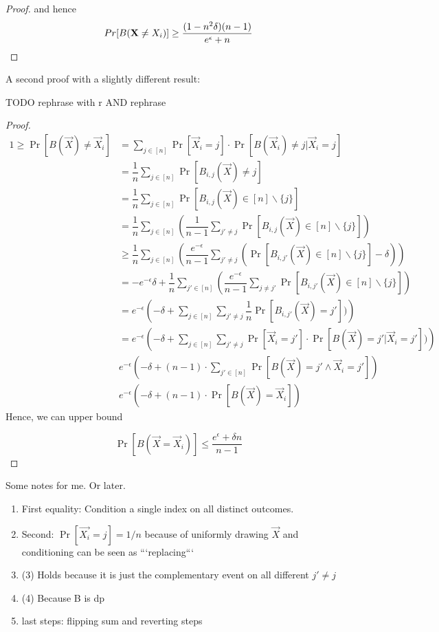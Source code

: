 \documentclass{article}
\begin{document}
{\begin{proof}
and hence 
\[
\\Pr[B(\vec{X}\neq X_i)] \geq \dfrac{(1-n^2\delta)(n-1)}{e^\epsilon + n}
\]
\end{proof}

A second proof with a slightly different result: 

TODO rephrase with r AND rephrase 
\begin{proof}
\begin{align*}
    1\geq \Pr[B(\vec{X})\neq \vec{X}_i] &= \sum\limits_{j\in [n]} \Pr[\vec{X}_i = j]\cdot \Pr[B(\vec{X}_i)\neq j|\vec{X}_i = j]\\
    &= \dfrac{1}{n} \sum\limits_{j\in [n]}\Pr[B_{i,j}(\vec{X}) \neq  j] \\
    &=\dfrac{1}{n} \sum_{j \in [n]} \Pr[B_{i,j}(\vec{X}) \in [n]\backslash\{j\} ]\\
    &=\dfrac{1}{n} \sum_{j \in [n]} \left(\dfrac{1}{n-1}\sum_{j' \neq j} \Pr[B_{i,j}(\vec{X}) \in [n]\backslash\{j\} ]\right)\\
    &\geq \dfrac{1}{n} \sum_{j \in [n]} \left( \dfrac{e^{-\epsilon}}{n-1}\sum_{j' \neq j} (\Pr[B_{i,j'}(\vec{X}) \in [n]\backslash\{j\}] - \delta)\right) \\
    &= -e^{-\epsilon}\delta + \dfrac{1}{n} \sum_{j' \in [n]} \left( \dfrac{e^{-\epsilon}}{n-1} \sum_{j \neq j'} \Pr[B_{i,j'}(\vec{X}) \in [n]\backslash\{j\}] \right) \\
    &= e^{-\epsilon} \left(-\delta + \sum_{j \in [n]} \sum_{j' \neq j}\dfrac{1}{n} \Pr[B_{i,j'}(\vec{X}) = j'])\right) \\
    &= e^{-\epsilon} \left(-\delta + \sum_{j \in [n]} \sum_{j' \neq j} \Pr[\vec{X}_i =  j'] \cdot \Pr[B(\vec{X})=j'|\vec{X}_i = j'])\right) \\
    &e^{-\epsilon}\left(-\delta + (n-1) \cdot \sum\limits_{j' \in [n]}\Pr[B(\vec{X})=j' \wedge \vec{X}_i = j']\right) \\
    &e^{-\epsilon}\left(-\delta + (n-1) \cdot \Pr[B(\vec{X}) = \vec{X}_i]\right)
\end{align*}
Hence, we can upper bound

\[
\Pr[B(\vec{X}=\vec{X}_i)] \leq \dfrac{e^\epsilon+\delta n}{n-1}
\]

\end{proof}

Some notes for me. Or later.
\begin{enumerate}
    \item First equality: Condition a single index on all distinct outcomes.
    \item Second: $\Pr[\vec{X_i} = j] = 1/n$ because of uniformly drawing $\vec{X}$ and conditioning can be seen as ```replacing```
    \item (3) Holds because it is just the complementary event on all different $j' \neq j$
    \item (4) Because B is dp
    \item last steps: flipping sum and reverting steps
\end{enumerate}

}
\end{document}
